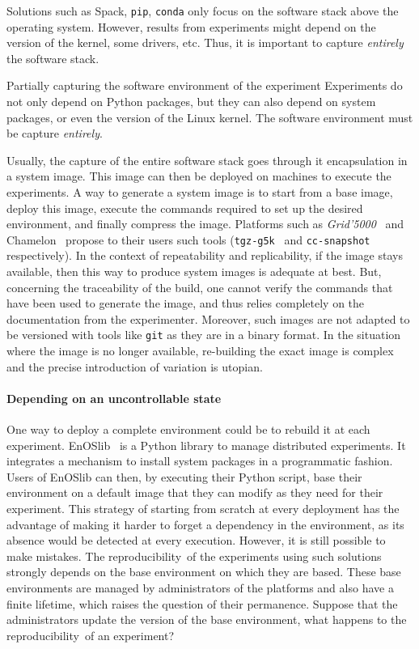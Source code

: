 \documentclass[sigconf,natbib=false]{acmart}
\newcommand{\repro}{reproducibility}
\newcommand{\grid}{\emph{Grid'5000}}
\begin{document}
Solutions such as Spack, \texttt{pip}, \texttt{conda} only focus on the software stack above the operating system.
However, results from experiments might depend on the version of the kernel, some drivers, etc.
Thus, it is important to capture \emph{entirely} the software stack.

\begin{trap}{Partially capturing the software environment of the experiment}{}
Experiments do not only depend on Python packages, but they can also depend on system packages, or even the version of the Linux kernel.
The software environment must be capture \emph{entirely}.
\end{trap}

Usually, the capture of the entire software stack goes through it encapsulation in a system image.
This image can then be deployed on machines to execute the experiments.
A way to generate a system image is to start from a base image, deploy this image, execute the commands required to set up the desired environment, and finally compress the image.
Platforms such as \grid\ \cite{grid5000} and Chamelon\ \cite{chameleon} propose to their users such tools (\texttt{tgz-g5k}\ \cite{tgz-g5k} and \texttt{cc-snapshot}\ \cite{cc-snapshot} respectively).
In the context of repeatability and replicability, if the image stays available, then this way to produce system images is adequate at best.
But, concerning the traceability of the build, one cannot verify the commands that have been used to generate the image, and thus relies completely on the documentation from the experimenter.
Moreover, such images are not adapted to be versioned with tools like \texttt{git} as they are in a binary format.
In the situation where the image is no longer available, re-building the exact image is complex and the precise introduction of variation is utopian.


\paragraph{Depending on an uncontrollable state}


One way to deploy a complete environment could be to rebuild it at each experiment.
EnOSlib\ \cite{cherrueau_enoslib_2022} is a Python library to manage distributed experiments.
It integrates a mechanism to install system packages in a programmatic fashion.
Users of EnOSlib can then, by executing their Python script, base their environment on a default image that they can modify as they need for their experiment.
This strategy of starting from scratch at every deployment has the advantage of making it harder to forget a dependency in the environment, as its absence would be detected at every execution.
However, it is still possible to make mistakes.
The \repro\ of the experiments using such solutions strongly depends on the base environment on which they are based.
These base environments are managed by administrators of the platforms and also have a finite lifetime, which raises the question of their permanence.  
Suppose that the administrators update the version of the base environment, what happens to the \repro\ of an experiment?
\end{document}
